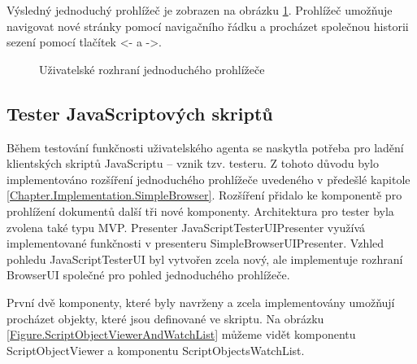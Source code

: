 Výsledný jednoduchý prohlížeč je zobrazen na obrázku \ref{Figure.SimpleBrowserScreenshot}. Prohlížeč umožňuje navigovat nové stránky pomocí navigačního řádku a procházet společnou historii sezení pomocí tlačítek <- a ->. 

\begin{figure}[H]
  \begin{center}
    \caption{Uživatelské rozhraní jednoduchého prohlížeče}
    \label{Figure.SimpleBrowserScreenshot}
  \end{center}
\end{figure}

\subsection{Tester JavaScriptových skriptů}
\label{Chapter.Implementation.JavaScriptTester}

Během testování funkčnosti uživatelského agenta se naskytla potřeba pro ladění klientských skriptů JavaScriptu -- vznik tzv. testeru. Z tohoto důvodu bylo implementováno rozšíření jednoduchého prohlížeče uvedeného v předešlé kapitole \ref{Chapter.Implementation.SimpleBrowser}. Rozšíření přidalo ke komponentě pro prohlížení dokumentů další tři nové komponenty. Architektura pro tester byla zvolena také typu MVP. Presenter JavaScriptTesterUIPresenter  využívá implementované funkčnosti v presenteru SimpleBrowserUIPresenter. Vzhled pohledu JavaScriptTesterUI byl vytvořen zcela nový, ale implementuje rozhraní BrowserUI společné pro pohled jednoduchého prohlížeče.

První dvě komponenty, které byly navrženy a zcela implementovány umožňují procházet objekty, které jsou definované ve skriptu. Na obrázku \ref{Figure.ScriptObjectViewerAndWatchList} můžeme vidět komponentu ScriptObjectViewer a komponentu ScriptObjectsWatchList. 

